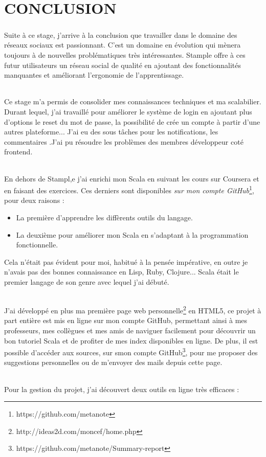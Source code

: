 \chapter{CONCLUSION}
\paragraph{}
Suite à ce stage, j’arrive à la conclusion que travailler dans le domaine des réseaux sociaux est passionnant. C’est un domaine en évolution qui mènera toujours à de nouvelles problématiques très intéressantes.
Stample offre à ces futur utilisateurs un réseau social de qualité en ajoutant des fonctionnalités manquantes et améliorant l'ergonomie de l'apprentissage.
\subparagraph{}
Ce stage m'a permis de consolider mes connaissances techniques et ma scalabilier.
Durant lequel, j'ai travaillé pour améliorer le système de login en ajoutant plus d'options le reset du mot de passe, la possibilité de crée un compte à partir d'une autres plateforme...
J'ai eu des sous tâches pour les notifications, les commentaires .J'ai pu résoudre les problèmes des membres développeur coté frontend.
\subparagraph{}
En dehors de Stampl,e j'ai enrichi mon Scala en suivant les cours sur Coursera et en faisant des exercices. Ces derniers sont disponibles \textit{sur mon compte GitHub}\footnote{https://github.com/metanote}, pour deux raisons :
\begin{itemize}
\item La première d'apprendre les diffèrents outils du langage.
\item La deuxième pour améliorer mon Scala en s'adaptant à la programmation fonctionnelle.
\end{itemize}
Cela n'était pas évident pour moi, habitué à la pensée impérative, en outre je n'avais pas des bonnes connaissance en Lisp, Ruby, Clojure... Scala était le premier langage de son genre avec lequel j'ai débuté.
\subparagraph{}
J'ai développé en plus ma première page web personnelle\footnote{http://ideas2d.com/moncef/home.php} en HTML5, ce projet à part entière est mis en ligne sur mon compte GitHub, permettant ainsi à mes professeurs, mes collègues et mes amis de naviguer facilement pour découvrir un bon tutoriel Scala et de profiter de mes index disponibles en ligne. De plus, il est possible d’accéder aux sources, sur smon compte GitHub\footnote{https://github.com/metanote/Summary-report}, pour me proposer des suggestions personnelles ou de m'envoyer des mails depuis cette page.
\subparagraph{}
Pour la gestion du projet, j'ai découvert deux outils en ligne très efficaces :\newline
